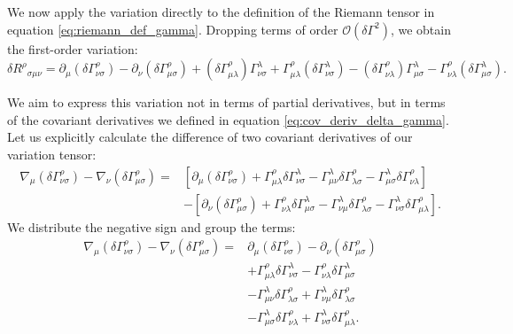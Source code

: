 \documentclass[11pt, a4paper]{report}
\begin{document}
We now apply the variation directly to the definition of the Riemann tensor in equation \eqref{eq:riemann_def_gamma}. Dropping terms of order $\mathcal{O}(\delta\Gamma^{2})$, we obtain the first-order variation:
\begin{equation}
\label{eq:delta_riemann_raw}
\delta{R^{\rho}}_{\sigma\mu\nu} = \partial_{\mu}(\delta\Gamma^{\rho}_{\nu\sigma}) - \partial_{\nu}(\delta\Gamma^{\rho}_{\mu\sigma}) + (\delta\Gamma^{\rho}_{\mu\lambda})\Gamma^{\lambda}_{\nu\sigma} + \Gamma^{\rho}_{\mu\lambda}(\delta\Gamma^{\lambda}_{\nu\sigma}) - (\delta\Gamma^{\rho}_{\nu\lambda})\Gamma^{\lambda}_{\mu\sigma} - \Gamma^{\rho}_{\nu\lambda}(\delta\Gamma^{\lambda}_{\mu\sigma}).
\end{equation}

We aim to express this variation not in terms of partial derivatives, but in terms of the covariant derivatives we defined in equation \eqref{eq:cov_deriv_delta_gamma}. Let us explicitly calculate the difference of two covariant derivatives of our variation tensor:
\begin{align}
\nabla_{\mu}(\delta\Gamma^{\rho}_{\nu\sigma}) - \nabla_{\nu}(\delta\Gamma^{\rho}_{\mu\sigma}) =& \left[ \partial_{\mu}(\delta\Gamma^{\rho}_{\nu\sigma}) + \Gamma^{\rho}_{\mu\lambda}\delta\Gamma^{\lambda}_{\nu\sigma} - \Gamma^{\lambda}_{\mu\nu}\delta\Gamma^{\rho}_{\lambda\sigma} - \Gamma^{\lambda}_{\mu\sigma}\delta\Gamma^{\rho}_{\nu\lambda} \right] \nonumber \\
& - \left[ \partial_{\nu}(\delta\Gamma^{\rho}_{\mu\sigma}) + \Gamma^{\rho}_{\nu\lambda}\delta\Gamma^{\lambda}_{\mu\sigma} - \Gamma^{\lambda}_{\nu\mu}\delta\Gamma^{\rho}_{\lambda\sigma} - \Gamma^{\lambda}_{\nu\sigma}\delta\Gamma^{\rho}_{\mu\lambda} \right].
\end{align}
We distribute the negative sign and group the terms:
\begin{align}
\nabla_{\mu}(\delta\Gamma^{\rho}_{\nu\sigma}) - \nabla_{\nu}(\delta\Gamma^{\rho}_{\mu\sigma}) =& \partial_{\mu}(\delta\Gamma^{\rho}_{\nu\sigma}) - \partial_{\nu}(\delta\Gamma^{\rho}_{\mu\sigma}) \nonumber \\
& + \Gamma^{\rho}_{\mu\lambda}\delta\Gamma^{\lambda}_{\nu\sigma} - \Gamma^{\rho}_{\nu\lambda}\delta\Gamma^{\lambda}_{\mu\sigma} \nonumber \\
& - \Gamma^{\lambda}_{\mu\nu}\delta\Gamma^{\rho}_{\lambda\sigma} + \Gamma^{\lambda}_{\nu\mu}\delta\Gamma^{\rho}_{\lambda\sigma} \nonumber \\
& - \Gamma^{\lambda}_{\mu\sigma}\delta\Gamma^{\rho}_{\nu\lambda} + \Gamma^{\lambda}_{\nu\sigma}\delta\Gamma^{\rho}_{\mu\lambda}.
\end{align}
\end{document}

